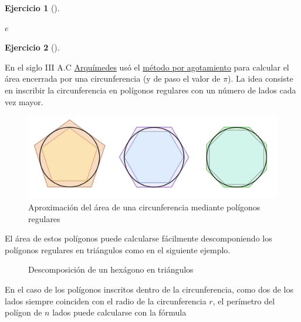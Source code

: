 \documentclass[
  a4paper,
]{scrreport}
\theoremstyle{definition}
\newtheorem{exercise}{Ejercicio}[chapter]
\theoremstyle{remark}
\begin{document}
\begin{exercise}[]
\begin{tcolorbox}
$e$

\end{tcolorbox}

\end{exercise}

\begin{exercise}[]\protect\hypertarget{exr-calculo-pi}{}\label{exr-calculo-pi}

En el siglo III A.C
\href{https://es.wikipedia.org/wiki/Arqu\%C3\%ADmedes}{Arquímedes} usó
el
\href{https://es.wikipedia.org/wiki/M\%C3\%A9todo_por_agotamiento}{método
por agotamiento} para calcular el área encerrada por una circunferencia
(y de paso el valor de \(\pi\)). La idea consiste en inscribir la
circunferencia en polígonos regulares con un número de lados cada vez
mayor.

\begin{figure}

{\centering \includegraphics{img/sucesiones/poligonos-circunferencia.png}

}

\caption{Aproximación del área de una circunferencia mediante polígonos
regulares}

\end{figure}

El área de estos polígonos puede calcularse fácilmente descomponiendo
los polígonos regulares en triángulos como en el siguiente ejemplo.

\begin{figure}

{\centering 



}

\caption{Descomposición de un hexágono en triángulos}

\end{figure}

En el caso de los polígonos inscritos dentro de la circunferencia, como
dos de los lados siempre coinciden con el radio de la circunferencia
\(r\), el perímetro del polígon de \(n\) lados puede calcularse con la
fórmula


\end{exercise}
\end{document}

